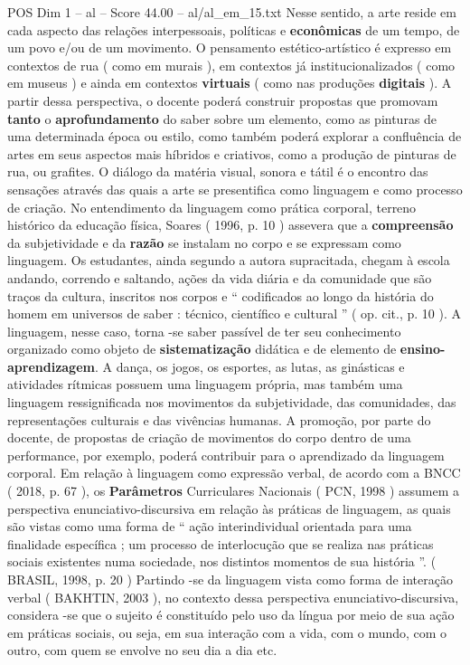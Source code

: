 \begin{textsample}{POS Dim 1 – al – Score 44.00 – al/al\_em\_15.txt}
Nesse sentido, a arte reside em cada aspecto das relações interpessoais, políticas e \textbf{econômicas} de um tempo, de um povo e/ou de um movimento.
O pensamento estético-artístico é expresso em contextos de rua ( como em murais ), em contextos já institucionalizados ( como em museus ) e ainda em contextos \textbf{virtuais} ( como nas produções \textbf{digitais} ).
A partir dessa perspectiva, o docente poderá construir propostas que promovam \textbf{tanto} o \textbf{aprofundamento} do saber sobre um elemento, como as pinturas de uma determinada época ou estilo, como também poderá explorar a confluência de artes em seus aspectos mais híbridos e criativos, como a produção de pinturas de rua, ou grafites.
O diálogo da matéria visual, sonora e tátil é o encontro das sensações através das quais a arte se presentifica como linguagem e como processo de criação.
No entendimento da linguagem como prática corporal, terreno histórico da educação física, Soares ( 1996, p. 10 ) assevera que a \textbf{compreensão} da subjetividade e da \textbf{razão} se instalam no corpo e se expressam como linguagem.
Os estudantes, ainda segundo a autora supracitada, chegam à escola andando, correndo e saltando, ações da vida diária e da comunidade que são traços da cultura, inscritos nos corpos e “ codificados ao longo da história do homem em universos de saber : técnico, científico e cultural ” ( op. cit., p. 10 ).
A linguagem, nesse caso, torna -se saber passível de ter seu conhecimento organizado como objeto de \textbf{sistematização} didática e de elemento de \textbf{ensino-aprendizagem}.
A dança, os jogos, os esportes, as lutas, as ginásticas e atividades rítmicas possuem uma linguagem própria, mas também uma linguagem ressignificada nos movimentos da subjetividade, das comunidades, das representações culturais e das vivências humanas.
A promoção, por parte do docente, de propostas de criação de movimentos do corpo dentro de uma performance, por exemplo, poderá contribuir para o aprendizado da linguagem corporal.
Em relação à linguagem como expressão verbal, de acordo com a BNCC ( 2018, p. 67 ), os \textbf{Parâmetros} Curriculares Nacionais ( PCN, 1998 ) assumem a perspectiva enunciativo-discursiva em relação às práticas de linguagem, as quais são vistas como uma forma de “ ação interindividual orientada para uma finalidade específica ; um processo de interlocução que se realiza nas práticas sociais existentes numa sociedade, nos distintos momentos de sua história ”. ( BRASIL, 1998, p. 20 ) Partindo -se da linguagem vista como forma de interação verbal ( BAKHTIN, 2003 ), no contexto dessa perspectiva enunciativo-discursiva, considera -se que o sujeito é constituído pelo uso da língua por meio de sua ação em práticas sociais, ou seja, em sua interação com a vida, com o mundo, com o outro, com quem se envolve no seu dia a dia etc.

\end{textsample}
